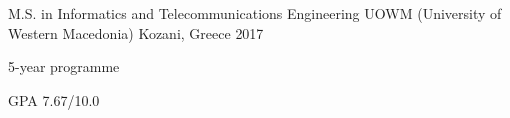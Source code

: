 


\begin{cventries}


\cventry
{M.S. in Informatics and Telecommunications Engineering} %
{UOWM (University of Western Macedonia)} %
{Kozani, Greece} %
{2017} %
{ %
\begin{cvitems}
\item {5-year programme}
\item {GPA 7.67/10.0}
\end{cvitems}
}


\end{cventries}
